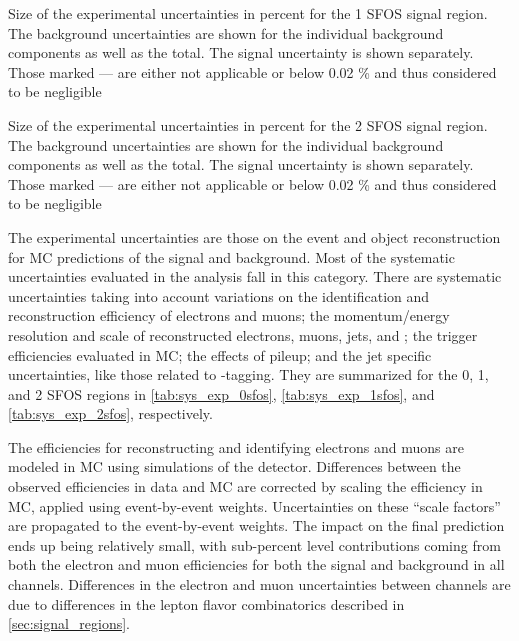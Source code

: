 \begin{table}[ht!]
\centering

\caption{Size of the experimental uncertainties in percent for the 1 SFOS signal region. The background uncertainties are shown for the individual background components as well as the total. The signal uncertainty is shown separately. Those marked --- are either not applicable or below 0.02 \% and thus considered to be negligible}
\label{tab:sys_exp_1sfos}
\end{table}

\begin{table}[ht!]
\centering

\caption{Size of the experimental uncertainties in percent for the 2 SFOS signal region. The background uncertainties are shown for the individual background components as well as the total. The signal uncertainty is shown separately. Those marked --- are either not applicable or below 0.02 \% and thus considered to be negligible}
\label{tab:sys_exp_2sfos}
\end{table}
The experimental uncertainties are those on the event and object
reconstruction for MC predictions of  the signal
and background.
Most of the systematic uncertainties evaluated in the analysis
fall in this category.
There are systematic uncertainties taking into account variations
on the identification and reconstruction
efficiency of electrons and muons; 
the momentum/energy resolution and scale of reconstructed electrons, muons,
jets, and \MET; the trigger
efficiencies evaluated in MC; the effects of pileup; and the jet 
specific uncertainties, like those related to \bee-tagging.
They are summarized for the 0, 1, and 2 SFOS regions
in \tab\ref{tab:sys_exp_0sfos}, 
\tab\ref{tab:sys_exp_1sfos}, and
\tab\ref{tab:sys_exp_2sfos}, respectively.

The efficiencies for reconstructing and identifying electrons and muons
are modeled in MC using simulations of the detector. Differences
between the observed efficiencies in data and MC are corrected by scaling
the efficiency in MC, applied using event-by-event weights. 
Uncertainties on these ``scale factors'' are propagated to the event-by-event
weights.  The impact on the final prediction ends up being relatively
small, with sub-percent level contributions coming from both the electron
and muon efficiencies for both the signal and background in all channels.
Differences in the electron and muon uncertainties between channels
are due to differences in the lepton flavor combinatorics described in
\sec\ref{sec:signal_regions}.

